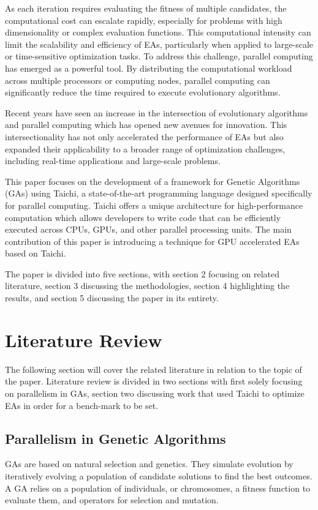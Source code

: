 \documentclass[conference]{IEEEtran}
\begin{document}
As each iteration requires evaluating the fitness of multiple candidates, the
computational cost can escalate rapidly, especially for problems with high
dimensionality or complex evaluation functions. This computational intensity
can limit the scalability and efficiency of EAs, particularly when applied to
large-scale or time-sensitive optimization tasks. To address this challenge,
parallel computing has emerged as a powerful tool. By distributing the
computational workload across multiple processors or computing nodes, parallel
computing can significantly reduce the time required to execute evolutionary
algorithms.

Recent years have seen an increase in the intersection of evolutionary
algorithms and parallel computing which has opened new avenues for innovation.
This intersectionality has not only accelerated the performance of EAs but also
expanded their applicability to a broader range of optimization challenges,
including real-time applications and large-scale problems.

This paper focuses on the development of a framework for Genetic Algorithms
(GAs) using Taichi, a state-of-the-art programming language designed
specifically for parallel computing. Taichi offers a unique architecture for
high-performance computation which allows developers to write code that can be
efficiently executed across CPUs, GPUs, and other parallel processing units.
The main contribution of this paper is introducing a technique for GPU
accelerated EAs based on Taichi.

The paper is divided into five sections, with section 2 focusing on related
literature, section 3 discussing the methodologies, section 4 highlighting the
results, and section 5 discussing the paper in its entirety.

\section{Literature Review}
The following section will cover the related literature in relation to the
topic of the paper. Literature review is divided in two sections with first
solely focusing on parallelism in GAs, section two discussing work that used
Taichi to optimize EAs in order for a bench-mark to be set.

\subsection{Parallelism in Genetic Algorithms}
GAs are based on natural selection and genetics. They simulate evolution by
iteratively evolving a population of candidate solutions to find the best
outcomes. A GA relies on a population of individuals, or chromosomes, a fitness
function to evaluate them, and operators for selection and mutation.
\end{document}
